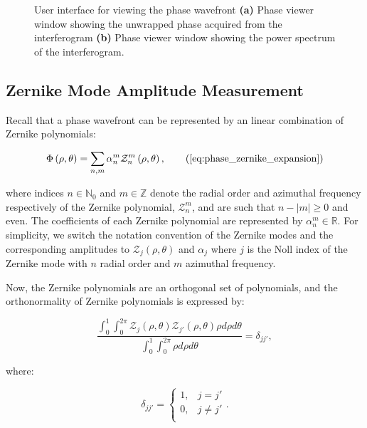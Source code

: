 \begin{figure}[h]
\begin{subfigure}{0.45\textwidth}
		\caption{}
		\label{fig:phase_viewer_ft}
	\end{subfigure}
	\caption[User interface for viewing the phase wavefront]{User interface for viewing the phase wavefront \textbf{(a)} Phase viewer window showing the unwrapped phase acquired from the interferogram \textbf{(b)} Phase viewer window showing the power spectrum of the interferogram. }
	\label{fig:phase_viewer}
\end{figure}

\subsection{Zernike Mode Amplitude Measurement}
\label{subsec:zernike_mode_measurment}

Recall that a phase wavefront can be represented by an linear combination of Zernike polynomials:

\begin{equation}
\Phi\left(\rho,\theta\right) = \sum\limits_{n,m}\alpha^{m}_{n}\mathcal{Z}^{m}_{n}\left(\rho,\theta\right),\tag{\ref{eq:phase_zernike_expansion}}
\end{equation}

where indices $n \in \mathbb{N}_{0}$ and $m \in \mathbb{Z}$ denote the radial order and azimuthal frequency respectively of the Zernike polynomial, $\mathcal{Z}^{m}_{n}$, and are such that $n - \left|m\right| \ge 0$ and even. The coefficients of each Zernike polynomial are represented by $\alpha^{m}_{n} \in \mathbb{R}$. For simplicity, we switch the notation convention of the Zernike modes and the corresponding amplitudes to $\mathcal{Z}_{j}\left(\rho,\theta\right)$ and $\alpha_{j}$ where $j$ is the Noll index of the Zernike mode with $n$ radial order and $m$ azimuthal frequency.

Now, the Zernike polynomials are an orthogonal set of polynomials, and the orthonormality of Zernike polynomials is expressed by\cite{lakshminarayanan2011zernike}:

\begin{equation}\label{eq:orthonormality}
	\frac{\int_{0}^{1}\int_{0}^{2\pi}\mathcal{Z}_{j}\left(\rho,\theta\right)\mathcal{Z}_{j'}\left(\rho,\theta\right)\rho d\rho d\theta}{\int_{0}^{1}\int_{0}^{2\pi}\rho d\rho d\theta} = \delta_{jj'},
\end{equation}

where:

\begin{equation}\label{eq:delta_j}
\delta_{jj'} = 
\begin{cases}
1, & j = j'\\
0, & j \ne j'\\ 
\end{cases}.
\end{equation}

